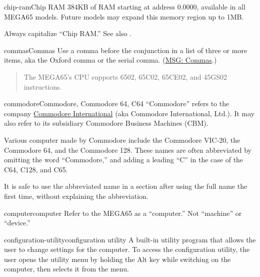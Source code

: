 \begin{sgentry}{chip-ram}{Chip RAM}
    384KB of RAM starting at address 0.0000, available in all MEGA65 models. Future models may expand this memory region up to 1MB.

    Always capitalize ``Chip RAM.'' See also .
\end{sgentry}

\begin{sgentry}{commas}{Commas}
    Use a comma before the conjunction in a list of three or more items, aka the Oxford comma or the serial comma. (\href{https://learn.microsoft.com/en-us/style-guide/punctuation/commas}{MSG: Commas}.)

    \begin{quote}
        The MEGA65's CPU supports 6502, 65C02, 65CE02, and 45GS02 instructions.
    \end{quote}
\end{sgentry}

\begin{sgentry}{commodore}{Commodore, Commodore 64, C64}
    ``Commodore'' refers to the company \href{https://en.wikipedia.org/wiki/Commodore_International}{Commodore International} (aka Commodore International, Ltd.). It may also refer to its subsidiary Commodore Business Machines (CBM).

    Various computer made by Commodore include the Commodore VIC-20, the Commodore 64, and the Commodore 128. These names are often abbreviated by omitting the word ``Commodore,'' and adding a leading ``C'' in the case of the C64, C128, and C65.

    It is safe to use the abbreviated name in a section after using the full name the first time, without explaining the abbreviation.
\end{sgentry}

\begin{sgentry}{computer}{computer}
    Refer to the MEGA65 as a ``computer.'' Not ``machine'' or ``device.''
\end{sgentry}

\begin{sgentry}{configuration-utility}{configuration utility}
    A built-in utility program that allows the user to change settings for the computer. To access the configuration utility, the user opens the utility menu by holding the Alt key while switching on the computer, then selects it from the menu.
\end{sgentry}

